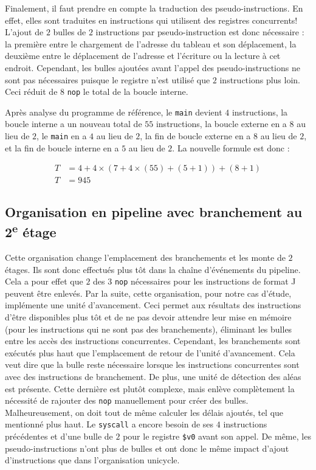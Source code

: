 \documentclass[a11paper]{article}
\begin{document}
Finalement, il faut prendre en compte la traduction des pseudo-instructions.
En effet, elles sont traduites en instructions qui utilisent des registres
concurrents! L'ajout de $2$ bulles de $2$ instructions par pseudo-instruction
est donc nécessaire : la première entre le chargement de l'adresse du tableau
et son déplacement, la deuxième entre le déplacement de l'adresse et
l'écriture ou la lecture à cet endroit. Cependant, les bulles ajoutées avant
l'appel des pseudo-instructions ne sont pas nécessaires puisque le registre
n'est utilisé que $2$ instructions plus loin. Ceci réduit de $8$ \verb|nop|
le total de la boucle interne.

Après analyse du programme de référence, le \verb|main| devient $4$
instructions, la boucle interne a un nouveau total de $55$ instructions, la
boucle externe en a $8$ au lieu de $2$, le \verb|main| en a $4$ au lieu de $2$,
la fin de boucle externe en a $8$ au lieu de $2$, et la fin de boucle interne
en a $5$ au lieu de $2$. La nouvelle formule est donc :

\begin{align}
  T &= 4+ 4\times(7+4\times(55)+(5+1)) + (8+1) \\
  T &= 945
\end{align}

\subsection{Organisation en pipeline avec branchement au 2\textsuperscript{e} étage}

Cette organisation change l'emplacement des branchements et les monte de
$2$ étages. Ils sont donc effectués plus tôt dans la chaîne d'événements du
pipeline. Cela a pour effet que $2$ des $3$ \verb|nop| nécessaires pour les
instructions de format J peuvent être enlevés. Par la suite, cette
organisation, pour notre cas d'étude, implémente une unité d'avancement. Ceci
permet aux résultats des instructions d'être disponibles plus tôt et de ne pas
devoir attendre leur mise en mémoire (pour les instructions qui ne sont pas
des branchements), éliminant les bulles entre les accès des instructions
concurrentes. Cependant, les branchements sont exécutés plus haut que
l'emplacement de retour de l'unité d'avancement. Cela veut dire que la bulle
reste nécessaire lorsque les instructions concurrentes sont avec des
instructions de branchement. De plus, une unité de détection des aléas est
présente. Cette dernière est plutôt complexe, mais enlève complètement la
nécessité de rajouter des \verb|nop| manuellement pour créer des bulles.
Malheureusement, on doit tout de même calculer les délais ajoutés, tel que
mentionné plus haut. Le \verb|syscall| a encore besoin de ses $4$
instructions précédentes et d'une bulle de $2$ pour le registre \verb|$v0|
avant son appel. De même, les pseudo-instructions n'ont plus de bulles et ont
donc le même impact d'ajout d'instructions que dans l'organisation unicycle.
\end{document}
